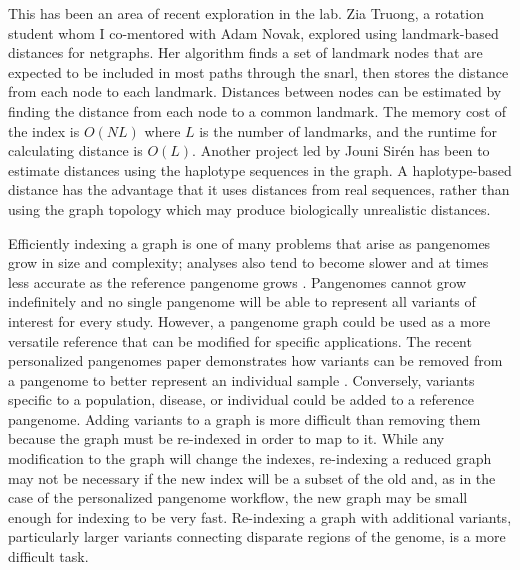 \documentclass[11pt]{ucscthesis}
\begin{document}
This has been an area of recent exploration in the lab.
Zia Truong, a rotation student whom I co-mentored with Adam Novak, explored using landmark-based distances for netgraphs.
Her algorithm finds a set of landmark nodes that are expected to be included in most paths through the snarl, then stores the distance from each node to each landmark.
Distances between nodes can be estimated by finding the distance from each node to a common landmark.
The memory cost of the index is $O(NL)$ where $L$ is the number of landmarks, and the runtime for calculating distance is $O(L)$.
Another project led by Jouni Sirén has been to estimate distances using the haplotype sequences in the graph.
A haplotype-based distance has the advantage that it uses distances from real sequences, rather than using the graph topology which may produce biologically unrealistic distances.

Efficiently indexing a graph is one of many problems that arise as pangenomes grow in size and complexity; analyses also tend to become slower and at times less accurate as the reference pangenome grows \cite{Pritt2018}.
Pangenomes cannot grow indefinitely and no single pangenome will be able to represent all variants of interest for every study.
However, a pangenome graph could be used as a more versatile reference that can be modified for specific applications.
The recent personalized pangenomes paper demonstrates how variants can be removed from a pangenome to better represent an individual sample \cite{siren_personalized_2024}. 
Conversely, variants specific to a population, disease, or individual could be added to a reference pangenome.
Adding variants to a graph is more difficult than removing them because the graph must be re-indexed in order to map to it.
While any modification to the graph will change the indexes, re-indexing a reduced graph may not be necessary if the new index will be a subset of the old and, as in the case of the personalized pangenome workflow, the new graph may be small enough for indexing to be very fast.
Re-indexing a graph with additional variants, particularly larger variants connecting disparate regions of the genome, is a more difficult task. 
\end{document}
